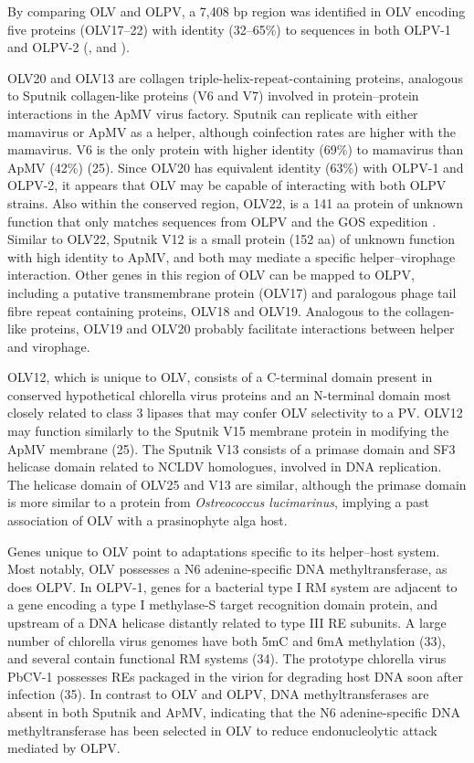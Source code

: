 By comparing \ac{OLV} and \ac{OLPV}, a 7,408 bp region was identified in \ac{OLV} encoding five proteins (OLV17--22) with identity (32--65\%) to sequences in both \ac{OLPV}-1 and \ac{OLPV}-2 (,  and ). 

OLV20 and OLV13 are collagen triple-helix-repeat-containing proteins, analogous to Sputnik collagen-like proteins (V6 and V7) involved in protein--protein interactions in the \ac{ApMV} virus factory. 
Sputnik can replicate with either mamavirus or \ac{ApMV} as a helper, although coinfection rates are higher with the mamavirus. 
V6 is the only protein with higher identity (69\%) to mamavirus than \ac{ApMV} (42\%) (25). 
Since OLV20 has equivalent identity (63\%) with \ac{OLPV}-1 and \ac{OLPV}-2, it appears that \ac{OLV} may be capable of interacting with both \ac{OLPV} strains. 
Also within the conserved region, OLV22, is a 141 aa protein of unknown function that only matches sequences from \ac{OLPV} and the \ac{GOS} expedition . 
Similar to OLV22, Sputnik V12 is a small protein (152 aa) of unknown function with high identity to \ac{ApMV}, and both may mediate a specific helper--virophage interaction. 
Other genes in this region of \ac{OLV} can be mapped to \ac{OLPV}, including a putative transmembrane protein (OLV17) and paralogous phage tail fibre repeat containing proteins, OLV18 and OLV19. 
Analogous to the collagen-like proteins, OLV19 and OLV20 probably facilitate interactions between helper and virophage. 

OLV12, which is unique to \ac{OLV}, consists of a C-terminal domain present in conserved hypothetical chlorella virus proteins and an N-terminal domain most closely related to class 3 lipases that may confer \ac{OLV} selectivity to a \ac{PV}. 
OLV12 may function similarly to the Sputnik V15 membrane protein in modifying the \ac{ApMV} membrane (25). 
The Sputnik V13 consists of a primase domain and SF3 helicase domain related to \ac{NCLDV} homologues, involved in \textsc{DNA} replication. 
The helicase domain of OLV25 and V13 are similar, although the primase domain is more similar to a protein from \emph{Ostreococcus lucimarinus}, implying a past association of \ac{OLV} with a prasinophyte alga host. 

Genes unique to \ac{OLV} point to adaptations specific to its helper--host system. 
Most notably, \ac{OLV} possesses a N6 adenine-specific \textsc{DNA} methyltransferase, as does \ac{OLPV}. 
In \ac{OLPV}-1, genes for a bacterial type I \ac{RM} system are adjacent to a gene encoding a type I methylase-S target recognition domain protein, and upstream of a \textsc{DNA} helicase distantly related to type III \ac{RE} subunits. 
A large number of chlorella virus genomes have both 5mC and 6mA methylation (33), and several contain functional \ac{RM} systems (34). 
The prototype chlorella virus PbCV-1 possesses REs packaged in the virion for degrading host \textsc{DNA} soon after infection (35). 
In contrast to \ac{OLV} and \ac{OLPV}, \textsc{DNA} methyltransferases are absent in both Sputnik and \textsc{ApMV}, indicating that the N6 adenine-specific \textsc{DNA} methyltransferase has been selected in \ac{OLV} to reduce endonucleolytic attack mediated by \ac{OLPV}. 

